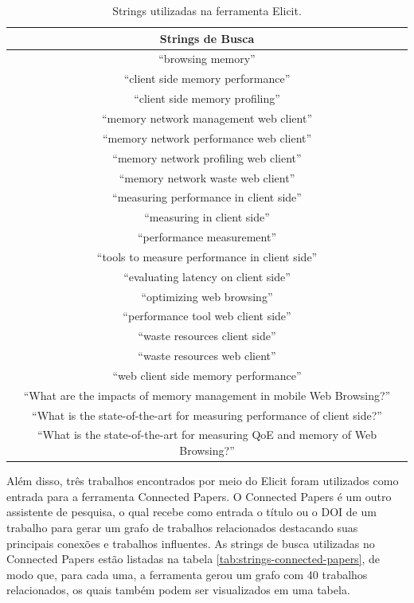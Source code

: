 \documentclass[12pt]{tcc}
\begin{document}
	\begin{table}[h!]
	\centering
	\caption{Strings utilizadas na ferramenta Elicit.\label{long}}

	\begin{tabular}{||c||} 
		
	\hline
		Strings de Busca \\
	\hline\hline
	``browsing memory'' \\
	``client side memory performance'' \\
	``client side memory profiling'' \\
	``memory network management web client'' \\
	``memory network performance web client'' \\
	``memory network profiling web client'' \\
	``memory network waste web client'' \\
	``measuring performance in client side'' \\
	``measuring in client side'' \\
	``performance measurement'' \\
	``tools to measure performance in client side'' \\
	``evaluating latency on client side'' \\
	``optimizing web browsing'' \\
	``performance tool web client side'' \\
	``waste resources client side'' \\
	``waste resources web client'' \\
	``web client side memory performance'' \\
	``What are the impacts of memory management in mobile Web Browsing?'' \\
	``What is the state-of-the-art for measuring performance of client side?'' \\
	``What is the state-of-the-art for measuring QoE and memory of Web Browsing?'' \\

	\hline
	\end{tabular}
	\label{tab:strings-elicit}
	\end{table}

	Além disso, três trabalhos encontrados por meio do Elicit foram utilizados como entrada para a ferramenta Connected Papers.
	O Connected Papers é um outro assistente de pesquisa, o qual recebe como entrada o título ou o DOI de um trabalho para gerar um grafo de trabalhos relacionados destacando suas principais conexões e trabalhos influentes.
	As strings de busca utilizadas no Connected Papers estão listadas na tabela \ref{tab:strings-connected-papers}, de modo que, para cada uma, a ferramenta gerou um grafo com 40 trabalhos relacionados, os quais também podem ser visualizados em uma tabela. \\
\end{document}
